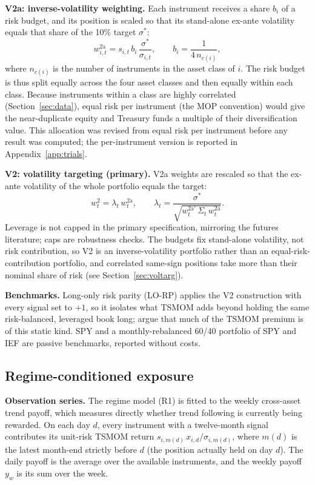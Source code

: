 \documentclass[11pt,a4paper]{article}
\begin{document}
\textbf{V2a: inverse-volatility weighting.} Each instrument receives a share $b_i$ of a risk budget, and its position is scaled so that its stand-alone ex-ante volatility equals that share of the 10\% target $\sigma^* $:
\begin{equation}
w^{\mathrm{2a}}_{i,t} = s_{i,t}\, b_i\, \frac{\sigma^*}{\sigma_{i,t}}, \qquad b_i = \frac{1}{4\,n_{c(i)}},
\end{equation}
where $n_{c(i)}$ is the number of instruments in the asset class of $i$. The risk budget is thus split equally across the four asset classes and then equally within each class. Because instruments within a class are highly correlated (Section~\ref{sec:data}), equal risk per instrument (the MOP convention) would give the near-duplicate equity and Treasury funds a multiple of their diversification value. This allocation was revised from equal risk per instrument before any result was computed; the per-instrument version is reported in Appendix~\ref{app:trials}.

\textbf{V2: volatility targeting (primary).} V2a weights are rescaled so that the ex-ante volatility of the whole portfolio equals the target:
\begin{equation}
w^{\mathrm{2}}_{t} = \lambda_t\, w^{\mathrm{2a}}_{t}, \qquad \lambda_t = \frac{\sigma^*}{\sqrt{ w^{\mathrm{2a}\prime}_{t}\, \Sigma_t\, w^{\mathrm{2a}}_{t}}}.
\end{equation}
Leverage is not capped in the primary specification, mirroring the futures literature; caps are robustness checks. The budgets fix stand-alone volatility, not risk contribution, so V2 is an inverse-volatility portfolio rather than an equal-risk-contribution portfolio, and correlated same-sign positions take more than their nominal share of risk (see Section~\ref{sec:voltarg}).

\textbf{Benchmarks.} Long-only risk parity (LO-RP) applies the V2 construction with every signal set to $+1$, so it isolates what TSMOM adds beyond holding the same risk-balanced, leveraged book long; \citet{huang2020} argue that much of the TSMOM premium is of this static kind. SPY and a monthly-rebalanced 60/40 portfolio of SPY and IEF are passive benchmarks, reported without costs.

\subsection{Regime-conditioned exposure}
\label{sec:regime_method}

\textbf{Observation series.} The regime model (R1) is fitted to the weekly cross-asset trend payoff, which measures directly whether trend following is currently being rewarded. On each day $d$, every instrument with a twelve-month signal contributes its unit-risk TSMOM return $s_{i,m(d)}\, x_{i,d} / \sigma_{i,m(d)}$, where $m(d)$ is the latest month-end strictly before $d$ (the position actually held on day $d$). The daily payoff is the average over the available instruments, and the weekly payoff $y_w$ is its sum over the week.
\end{document}
